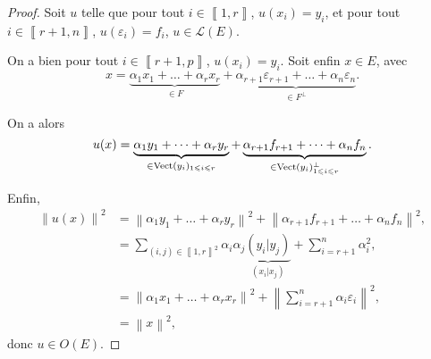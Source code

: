 \documentclass[12pt]{article}
\begin{document}
\begin{proof}
	Soit $u$ telle que pour tout $i\in\left\llbracket1,r\right\rrbracket$, $u(x_i)=y_i$, et pour tout $i\in\left\llbracket r+1,n\right\rrbracket$, $u(\varepsilon_i)=f_i$, $u\in\mathcal{L}(E)$.

	On a bien pour tout $i\in\left\llbracket r+1,p\right\rrbracket$, $u(x_i)=y_i$. Soit enfin $x\in E$, avec 
	\begin{equation}
		x=\underbrace{\alpha_1 x_1+\dots+\alpha_r x_r}_{\in F}+\underbrace{\alpha_{r+1}\varepsilon_{r+1}+\dots+\alpha_{n}\varepsilon_{n}}_{\in F^{\perp}}.	
	\end{equation}
	
	On a alors 
	\begin{equation}
		u(x)=\underbrace{\alpha_1 y_1+\dots+\alpha_{r}y_r}_{\in\operatorname{Vect}(y_i)_{1\leqslant i\leqslant r}}+\underbrace{\alpha_{r+1}f_{r+1}+\dots+\alpha_n f_n}_{\in \operatorname{Vect}(y_i)_{1\leqslant i\leqslant r}^{\perp}}.
	\end{equation}

	Enfin,
	\begin{align}
		\left\lVert u(x)\right\rVert^{2}
		&=\left\lVert \alpha_{1}y_{1}+\dots+\alpha_{r}y_{r}\right\rVert^{2}+\left\lVert \alpha_{r+1}f_{r+1}+\dots+\alpha_{n}f_{n}\right\rVert^{2},\\
		&=\sum_{(i,j)\in\left\llbracket1,r\right\rrbracket^{2}}\alpha_{i}\alpha_{j}\underbrace{(y_i|y_j)}_{(x_i|x_j)}+\sum_{i=r+1}^{n}\alpha_{i}^{2},\\
		&=\left\lVert \alpha_{1}x_{1}+\dots+\alpha_{r}x_{r}\right\rVert^{2}+\left\lVert \sum_{i=r+1}^{n}\alpha_{i}\varepsilon_{i}\right\rVert^{2},\\
		&=\left\lVert x\right\rVert^{2},
	\end{align}
	donc $u\in O(E)$.
\end{proof}
\end{document}
